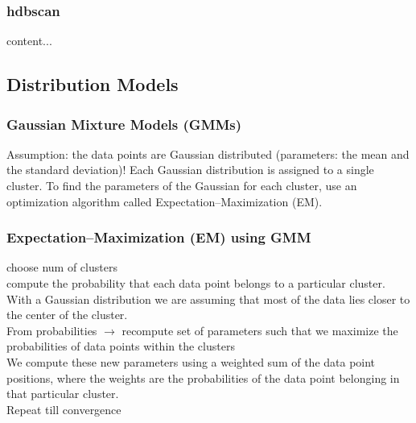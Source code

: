 \documentclass{beamer}
\begin{document}
\begin{frame}\frametitle{hdbscan}
content...
\end{frame}



\subsection{Distribution Models}
\begin{frame}\frametitle{Gaussian Mixture Models (GMMs)}
Assumption: the data points are Gaussian distributed (parameters: the mean and the standard deviation)! Each Gaussian distribution is assigned to a single cluster.
To find the parameters of the Gaussian for each cluster, use an optimization algorithm called Expectation–Maximization (EM). 

\end{frame}

\begin{frame}\frametitle{Expectation–Maximization (EM) using GMM}
choose num of clusters\\
compute the probability that each data point belongs to a particular cluster. With a Gaussian distribution we are assuming that most of the data lies closer to the center of the cluster.\\
From probabilities $\rightarrow$ recompute set of parameters such that we maximize the probabilities of data points within the clusters\\
We compute these new parameters using a weighted sum of the data point positions, where the weights are the probabilities of the data point belonging in that particular cluster.\\
Repeat till convergence\\

\end{frame}
\end{document}
